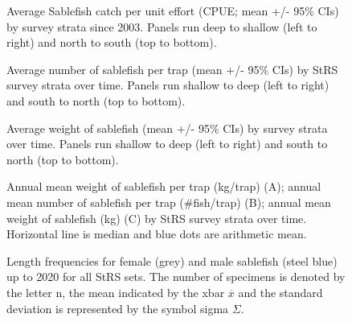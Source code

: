 \documentclass[12pt]{article}\usepackage[]{graphicx}\usepackage[]{color}
\begin{document}
\begin{figure}[htb]

{\centering {} 

}

\caption{Average Sablefish catch per unit effort (CPUE; mean +/- 95\% CIs) by survey strata since 2003. Panels run deep to shallow (left to right) and north to south (top to bottom).}\label{fig:figure6}
\end{figure}
\clearpage


\begin{figure}[htb]

{\centering {} 

}

\caption{Average number of sablefish per trap (mean +/- 95\% CIs) by StRS survey strata over time. Panels run shallow to deep (left to right) and south to north (top to bottom).}\label{fig:figure7}
\end{figure}
\clearpage


\begin{figure}[htb]

{\centering {} 

}

\caption{Average weight of sablefish (mean +/- 95\% CIs) by survey strata over time. Panels run shallow to deep (left to right) and south to north (top to bottom).}\label{fig:figure8}
\end{figure}
\clearpage


\begin{figure}[htb]

{\centering {} 

}

\caption{Annual mean weight of sablefish per trap (kg/trap) (A); annual mean number of sablefish per trap (\#fish/trap) (B); annual mean weight of sablefish (kg) (C) by StRS survey strata over time. Horizontal line is median and blue dots are arithmetic mean.}\label{fig:figure9}
\end{figure}
\clearpage


\begin{figure}[htb]

{\centering {} 

}

\caption{Length frequencies for female (grey) and male sablefish (steel blue) up to 2020 for all StRS sets. The number of specimens is denoted by the letter n, the mean indicated by the xbar \(\overline{x}\) and the standard deviation is represented by the symbol sigma \(\Sigma\).}\label{fig:figure10}
\end{figure}
\end{document}
